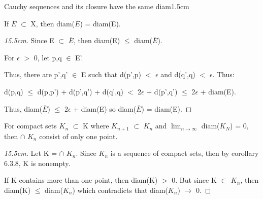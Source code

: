     \begin{ltheorem}{Cauchy sequences and its closure have the same diam}{1.5cm}
        \item If $\overline{E}$ $\subset$ X, then diam($\overline{E}$) = diam(E).
        
            \begin{proof}[15.5cm]
                Since E $\subset$ $\overline{E}$, then
                diam(E) $\leq$ diam($\overline{E}$).

                For $\epsilon$ $>$ 0, let p,q $\in$ E'.

                Thus, there are p',q' $\in$ E such that
                d(p',p) $<$ $\epsilon$ and d(q',q) $<$ $\epsilon$.
                Thus:

                d(p,q) $\leq$ d(p,p') + d(p',q') + d(q',q)
                $<$ 2$\epsilon$ + d(p',q')
                $\leq$ 2$\epsilon$ + diam(E).

                Thus, diam($\overline{E}$) $\leq$ 2$\epsilon$ + diam(E)
                so diam($\overline{E}$) = diam(E).                
            \end{proof}

        \item For compact sets $K_n$ $\subset$ K where $K_{n+1}$ $\subset$ $K_n$
            and $\lim_{n \rightarrow \infty}$ diam($K_N$) = 0,
            then $\cap$ $K_n$ consist of only one point.

            \begin{proof}[15.5cm]
                Let K = $\cap$ $K_n$.
                Since $K_n$ is a sequence of compact sets, then
                by {\color{orange} corollary 6.3.8}, K is nonempty.

                If K contains more than one point, then diam(K) $>$ 0.
                But since K $\subset$ $K_n$, then diam(K) $\leq$ diam($K_n$)
                which contradicts that diam($K_n$) $\rightarrow$ 0.
            \end{proof}
    \end{ltheorem}

    \vspace{0.5cm}



